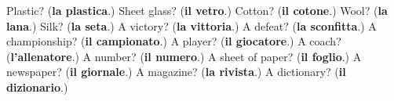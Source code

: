 \begin{tcolorbox}[breakable,colback=teal!4,colframe=teal!35!black,title={Before you move on}]
Plastic? (\textbf{la plastica}.) Sheet glass? (\textbf{il vetro}.) Cotton? (\textbf{il cotone}.) Wool? (\textbf{la lana}.) Silk? (\textbf{la seta}.) A victory? (\textbf{la vittoria}.) A defeat? (\textbf{la sconfitta}.) A championship? (\textbf{il campionato}.) A player? (\textbf{il giocatore}.) A coach? (\textbf{l'allenatore}.) A number? (\textbf{il numero}.) A sheet of paper? (\textbf{il foglio}.) A newspaper? (\textbf{il giornale}.) A magazine? (\textbf{la rivista}.) A dictionary? (\textbf{il dizionario}.)
\end{tcolorbox}

